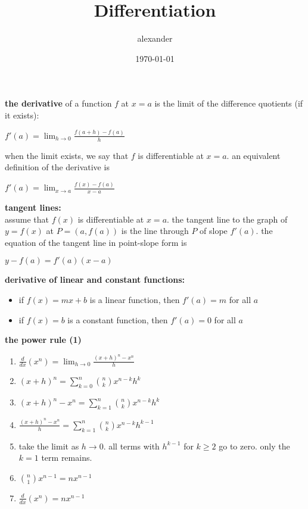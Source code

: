 \documentclass{article}
\title{Differentiation}
\author{alexander}
\date{\today}
\begin{document}
\maketitle

\textbf{the derivative} of a function $f$ at $x = a$ is the limit of the difference quotients (if it exists):
\begin{center} $f'(a) = \lim_{h \to 0}\frac{f(a + h) - f(a)}{h}$ \end{center}
when the limit exists, we say that $f$ is differentiable at $x = a$. an equivalent definition of the derivative is
\begin{center} $f'(a) = \lim_{x \to a}\frac{f(x) - f(a)}{x - a}$ \end{center}

\textbf{tangent lines:}\\
assume that $f(x)$ is differentiable at $x = a$. the tangent line to the graph of $y = f(x)$ at $P = (a, f(a))$ is the line through $P$ of slope $f'(a)$. the equation of the tangent line in point-slope form is
\begin{center} $y - f(a) = f'(a)(x - a)$ \end{center}

\textbf{derivative of linear and constant functions:}
	\begin{itemize}
		\item if $f(x) = mx + b$ is a linear function, then $f'(a) = m$ for all $a$
		\item if $f(x) = b$ is a constant function, then $f'(a) = 0$ for all $a$
	\end{itemize}

\textbf{the power rule (1)}
	\begin{enumerate}
		\item $\frac{d}{dx}(x^n) = \lim_{h \to 0}\frac{(x + h)^n - x^n}{h}$
		\item $(x + h)^n = \sum_{k=0}^{n}\binom{n}{k}x^{n-k}h^k$
		\item $(x + h)^n - x^n = \sum_{k=1}^{n}\binom{n}{k}x^{n-k}h^k$ 
		\item $\frac{(x + h)^n - x^n}{h} = \sum_{k=1}^{n}\binom{n}{k}x^{n-k}h^{k-1}$ 
		\item take the limit as $h \to 0$. all terms with $h^{k-1}$ for $k \geq 2$ go to zero. only the $k=1$ term remains.
		\item $\binom{n}{1}x^{n-1} = nx^{n-1}$
		\item $\frac{d}{dx}(x^n) = nx^{n-1}$
	\end{enumerate}
\end{document}
